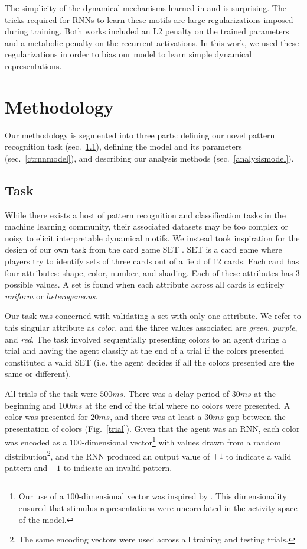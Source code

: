 \documentclass[conference]{IEEEtran}
\begin{document}
The simplicity of the dynamical mechanisms learned in \cite{driscoll2022flexible} and \cite{kay2022neural} is surprising. The tricks required for RNNs to learn these motifs are large regularizations imposed during training. Both works included an L2 penalty on the trained parameters and a metabolic penalty on the recurrent activations. In this work, we used these regularizations in order to bias our model to learn simple dynamical representations.

\section{Methodology}
Our methodology is segmented into three parts: defining our novel pattern recognition task (sec.~\ref{taskmethod}), defining the model and its parameters (sec.~\ref{ctrnnmodel}), and describing our analysis methods (sec.~\ref{analysismodel}).

\subsection{Task}
\label{taskmethod}

While there exists a host of pattern recognition and classification tasks in the machine learning community, their associated datasets may be too complex or noisy to elicit interpretable dynamical motifs. We instead took inspiration for the design of our own task from the card game SET \cite{gordon2017joy}. SET is a card game where players try to identify sets of three cards out of a field of 12 cards. Each card has four attributes: shape, color, number, and shading. Each of these attributes has 3 possible values. A set is found when each attribute across all cards is entirely \textit{uniform} or \textit{heterogeneous}.

Our task was concerned with validating a set with only one attribute. We refer to this singular attribute as \textit{color}, and the three values associated are \textit{green}, \textit{purple}, and \textit{red}. The task involved sequentially presenting colors to an agent during a trial and having the agent classify at the end of a trial if the colors presented constituted a valid SET (i.e. the agent decides if all the colors presented are the same or different).

All trials of the task were $500 ms$. There was a delay period of $30 ms$ at the beginning and $100 ms$ at the end of the trial where no colors were presented. A color was presented for $20 ms$, and there was at least a $30 ms$ gap between the presentation of colors (Fig.~\ref{trial}). Given that the agent was an RNN, each color was encoded as a $100$-dimensional vector\footnote{Our use of a $100$-dimensional vector was inspired by \cite{kay2022neural}. This dimensionality ensured that stimulus representations were uncorrelated in the activity space of the model.} with values drawn from a random distribution\footnote{The same encoding vectors were used across all training and testing trials.}, and the RNN produced an output value of $+1$ to indicate a valid pattern and $-1$ to indicate an invalid pattern.
\end{document}
